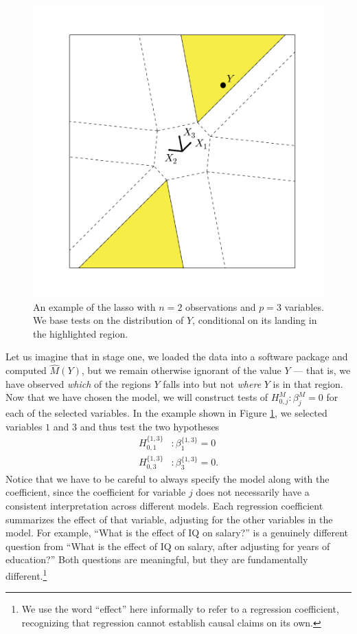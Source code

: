 \documentclass{article}
\theoremstyle{definition}
\newcommand{\hM}{\widehat{M}}
\begin{document}
\begin{figure}
\begin{center}
\includegraphics[trim = 23mm 23mm 23mm 23mm, clip=TRUE, width=.4\textwidth]{figs/fig_lasso1.png}
\end{center}
\caption{An example of the lasso with $n=2$ observations and $p=3$ variables. We base tests on the distribution of $Y$, conditional on its landing in the highlighted region.}
\label{fig:lasso_partition}
\end{figure}

Let us imagine that in stage one, we loaded the data into a software package and computed $\hM(Y)$, but we remain otherwise ignorant of the value $Y$ --- that is, we have observed {\em which} of the regions $Y$ falls into but not {\em where} $Y$ is in that region. Now that we have chosen the model, we will construct tests of $H_{0,j}^M: \beta^M_j = 0$ for each of the selected variables. In the example shown in Figure \ref{fig:lasso_partition}, we selected variables $1$ and $3$ and thus test the two hypotheses
\begin{align*}
H^{\{1, 3\}}_{0, 1}&: \beta^{\{1, 3\}}_1 = 0 \\
H^{\{1, 3\}}_{0, 3}&: \beta^{\{1, 3\}}_3 = 0.
\end{align*}
Notice that we have to be careful to always specify the model along with the coefficient, since the coefficient for variable $j$ does not necessarily have a consistent interpretation across different models. Each regression coefficient summarizes the effect of that variable, adjusting for the other variables in the model. For example, ``What is the effect of IQ on salary?'' is a genuinely different question from ``What is the effect of IQ on salary, after adjusting for years of education?''  Both questions are meaningful, but they are fundamentally different.\footnote{We use the word ``effect'' here informally to refer to a regression coefficient, recognizing that regression cannot establish causal claims on its own.}
\end{document}
